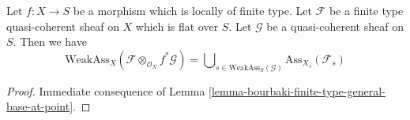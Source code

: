 \begin{lemma}
\label{lemma-bourbaki-finite-type-general-base}
Let $f : X \to S$ be a morphism which is locally of finite type.
Let $\mathcal{F}$ be a finite type quasi-coherent sheaf on $X$
which is flat over $S$. Let $\mathcal{G}$ be a quasi-coherent sheaf on $S$.
Then we have
$$
\text{WeakAss}_X(\mathcal{F} \otimes_{\mathcal{O}_X} f^*\mathcal{G}) =
\bigcup\nolimits_{s \in \text{WeakAss}_S(\mathcal{G})}
\text{Ass}_{X_s}(\mathcal{F}_s)
$$
\end{lemma}

\begin{proof}
Immediate consequence of
Lemma \ref{lemma-bourbaki-finite-type-general-base-at-point}.
\end{proof}
